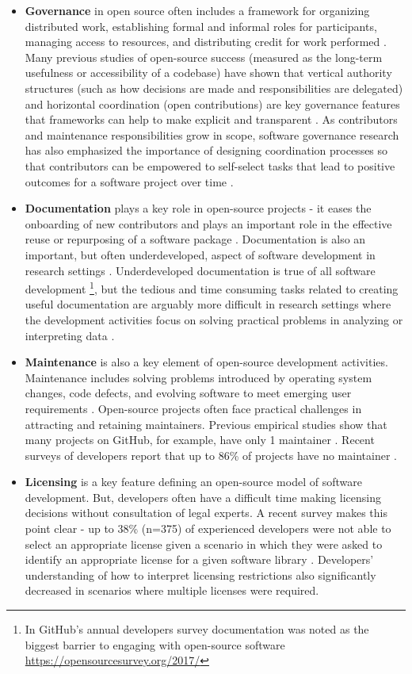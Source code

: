 \documentclass[
]{book}
\begin{document}
\begin{itemize}
\item
  \textbf{Governance} in open source often includes a framework for organizing distributed work, establishing formal and informal roles for participants, managing access to resources, and distributing credit for work performed \citep[ ]{o2007governance}.
  Many previous studies of open-source success (measured as the long-term usefulness or accessibility of a codebase) have shown that vertical authority structures (such as how decisions are made and responsibilities are delegated) and horizontal coordination (open contributions) are key governance features that frameworks can help to make explicit and transparent \citep{stewart2016studies}.
  As contributors and maintenance responsibilities grow in scope, software governance research has also emphasized the importance of designing coordination processes so that contributors can be empowered to self-select tasks that lead to positive outcomes for a software project over time \citep{shaikh2017governing}.
\item
  \textbf{Documentation} plays a key role in open-source projects - it eases the onboarding of new contributors and plays an important role in the effective reuse or repurposing of a software package \citep{aversano2017evaluating}.
  Documentation is also an important, but often underdeveloped, aspect of software development in research settings \citep{geiger2018types}.
  Underdeveloped documentation is true of all software development \footnote{In GitHub's annual developers survey documentation was noted as the biggest barrier to engaging with open-source software \url{https://opensourcesurvey.org/2017/}}, but the tedious and time consuming tasks related to creating useful documentation are arguably more difficult in research settings where the development activities focus on solving practical problems in analyzing or interpreting data \citep{ram2018community}.
\item
  \textbf{Maintenance} is also a key element of open-source development activities.
  Maintenance includes solving problems introduced by operating system changes, code defects, and evolving software to meet emerging user requirements \citep{bourque2004swebok}.
  Open-source projects often face practical challenges in attracting and retaining maintainers.
  Previous empirical studies show that many projects on GitHub, for example, have only 1 maintainer \citep{eghbal2016roads}.
  Recent surveys of developers report that up to 86\% of projects have no maintainer \citep{coelho2017modern}.
\item
  \textbf{Licensing} is a key feature defining an open-source model of software development.
  But, developers often have a difficult time making licensing decisions without consultation of legal experts.
  A recent survey makes this point clear - up to 38\% (n=375) of experienced developers were not able to select an appropriate license given a scenario in which they were asked to identify an appropriate license for a given software library \citep{almeida2017software}.
  Developers' understanding of how to interpret licensing restrictions also significantly decreased in scenarios where multiple licenses were required.
\end{itemize}
\end{document}
